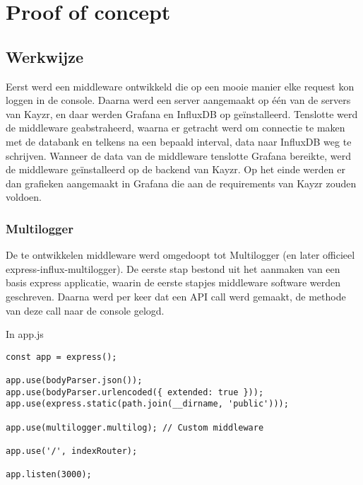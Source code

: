 
\chapter{Proof of concept}
\label{ch:proofOfConcept}

\section{Werkwijze}
\label{sec:werkwijze}

Eerst werd een middleware ontwikkeld die op een mooie manier elke request kon loggen in de console. Daarna werd een server aangemaakt op één van de servers van Kayzr, en daar werden Grafana en InfluxDB op geïnstalleerd. Tenslotte werd de middleware geabstraheerd, waarna er getracht werd om connectie te maken met de databank en telkens na een bepaald interval, data naar InfluxDB weg te schrijven. Wanneer de data van de middleware tenslotte Grafana bereikte, werd de middleware geïnstalleerd op de backend van Kayzr. Op het einde werden er dan grafieken aangemaakt in Grafana die aan de requirements van Kayzr zouden voldoen. 

\subsection{Multilogger}
\label{sec:multilogger}

De te ontwikkelen middleware werd omgedoopt tot Multilogger (en later officieel express-influx-multilogger). De eerste stap bestond uit het aanmaken van een basis express applicatie, waarin de eerste stapjes middleware software werden geschreven. Daarna werd per keer dat een API call werd gemaakt, de methode van deze call naar de console  gelogd.

\begin{minipage}{\linewidth}
	In app.js
\begin{lstlisting}[style=ES6, caption={app.js eerste stap},label=code:appjsFirst]
const app = express();

app.use(bodyParser.json());
app.use(bodyParser.urlencoded({ extended: true }));
app.use(express.static(path.join(__dirname, 'public')));

app.use(multilogger.multilog); // Custom middleware

app.use('/', indexRouter);

app.listen(3000);
\end{lstlisting}
\end{minipage}


